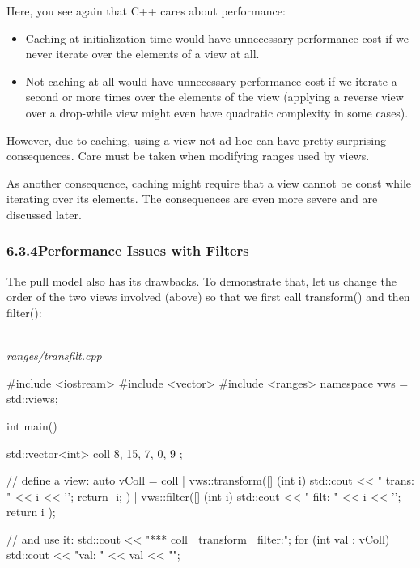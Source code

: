 Here, you see again that C++ cares about performance:

\begin{itemize}
\item
Caching at initialization time would have unnecessary performance cost if we never iterate over the elements of a view at all.

\item
Not caching at all would have unnecessary performance cost if we iterate a second or more times over the elements of the view (applying a reverse view over a drop-while view might even have quadratic complexity in some cases).
\end{itemize}

However, due to caching, using a view not ad hoc can have pretty surprising consequences. Care must be taken when modifying ranges used by views.

As another consequence, caching might require that a view cannot be const while iterating over its elements. The consequences are even more severe and are discussed later.

\subsubsection*{ 6.3.4\hspace{0.2cm}Performance Issues with Filters}

The pull model also has its drawbacks. To demonstrate that, let us change the order of the two views involved (above) so that we first call transform() and then filter():

\noindent
\hspace*{\fill} \\ %
\textit{ranges/transfilt.cpp}

\begin{cpp}
#include <iostream>
#include <vector>
#include <ranges>
namespace vws = std::views;

int main()
{
	std::vector<int> coll{ 8, 15, 7, 0, 9 };
	
	// define a view:
	auto vColl = coll
	| vws::transform([] (int i) {
		std::cout << " trans: " << i << '\n';
		return -i;
	})
	| vws::filter([] (int i) {
		std::cout << " filt: " << i << '\n';
		return i %
	});
	
	// and use it:
	std::cout << "*** coll | transform | filter:\n";
	for (int val : vColl) {
	std::cout << "val: " << val << "\n\n";
	}
}
\end{cpp}

